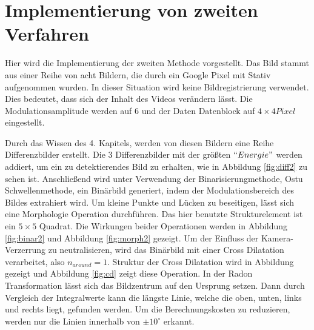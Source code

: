


\section{Implementierung von zweiten Verfahren}

Hier wird die Implementierung der zweiten Methode vorgestellt. Das Bild stammt aus einer Reihe von acht Bildern, die durch ein Google Pixel mit Stativ aufgenommen wurden. In dieser Situation wird keine Bildregistrierung verwendet. Dies bedeutet, dass sich der Inhalt des Videos verändern lässt. Die Modulationsamplitude werden auf 6 und der Daten Datenblock auf $ 4 \times 4 Pixel$ eingestellt. 

Durch das Wissen des 4. Kapitels, werden von diesen Bildern eine Reihe Differenzbilder erstellt. Die 3 Differenzbilder mit der größten $``Energie"$ werden addiert, um ein zu detektierendes Bild zu erhalten, wie in Abbildung \ref{fig:diff2} zu sehen ist. Anschließend wird unter Verwendung der Binarisierungmethode, Ostu Schwellenmethode, ein Binärbild generiert, indem der Modulationsbereich des Bildes extrahiert wird. Um kleine Punkte und Lücken zu beseitigen, lässt sich eine Morphologie Operation durchführen. Das hier benutzte Strukturelement ist ein $5 \times 5$ Quadrat. Die Wirkungen beider Operationen werden in Abbildung \ref{fig:binar2} und Abbildung \ref{fig:morph2} gezeigt. Um der Einfluss der Kamera-Verzerrung zu neutralisieren, wird das Binärbild mit einer Cross Dilatation verarbeitet, also $ n_{around} = 1$. Struktur der Cross Dilatation wird in Abbildung gezeigt und Abbildung \ref{fig:cd} zeigt diese Operation. 
In der Radon Transformation lässt sich das Bildzentrum auf den Ursprung setzen. Dann durch Vergleich der Integralwerte kann die längste Linie, welche die oben, unten, links und rechts liegt, gefunden werden. Um die Berechnungskosten zu reduzieren, werden nur die Linien innerhalb von $ \pm 10^{\circ} $ erkannt. 




